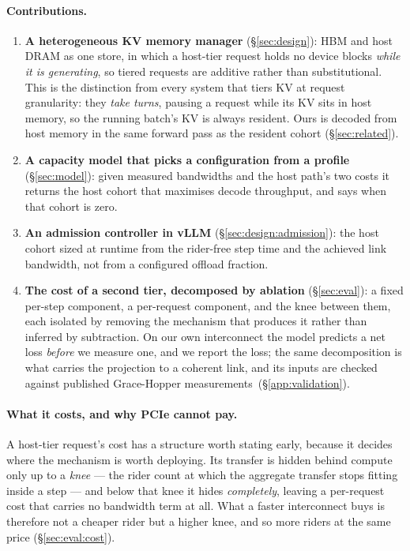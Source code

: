 \paragraph{Contributions.}
\begin{enumerate}\itemsep2pt
\item \textbf{A heterogeneous KV memory manager} (\S\ref{sec:design}): HBM and host
      DRAM as one store, in which a host-tier request holds no device blocks
      \emph{while it is generating}, so tiered requests are additive rather than
      substitutional. This is the distinction from every system that tiers KV at
      request granularity: they \emph{take turns}, pausing a request while its KV
      sits in host memory, so the running batch's KV is always resident. Ours is
      decoded from host memory in the same forward pass as the resident cohort
      (\S\ref{sec:related}).
\item \textbf{A capacity model that picks a configuration from a profile}
      (\S\ref{sec:model}): given measured bandwidths and the host path's two costs
      it returns the host cohort that maximises decode throughput, and says when
      that cohort is zero.
\item \textbf{An admission controller in vLLM} (\S\ref{sec:design:admission}): the
      host cohort sized at runtime from the rider-free step time and the achieved
      link bandwidth, not from a configured offload fraction.
\item \textbf{The cost of a second tier, decomposed by ablation}
      (\S\ref{sec:eval}): a fixed per-step component, a per-request component, and
      the knee between them, each isolated by removing the mechanism that produces
      it rather than inferred by subtraction. On our own interconnect the model
      predicts a net loss \emph{before} we measure one, and we report the loss; the
      same decomposition is what carries the projection to a coherent link, and its
      inputs are checked against published Grace-Hopper
      measurements\ifarxiv~(\S\ref{app:validation})\fi.
\end{enumerate}

\paragraph{What it costs, and why PCIe cannot pay.}
A host-tier request's cost has a structure worth stating early, because it decides
where the mechanism is worth deploying. Its transfer is hidden behind compute only
up to a \emph{knee} --- the rider count at which the aggregate transfer stops fitting
inside a step --- and below that knee it hides \emph{completely}, leaving a
per-request cost that carries no bandwidth term at all. What a faster interconnect
buys is therefore not a cheaper rider but a higher knee, and so more riders at the
same price (\S\ref{sec:eval:cost}).

